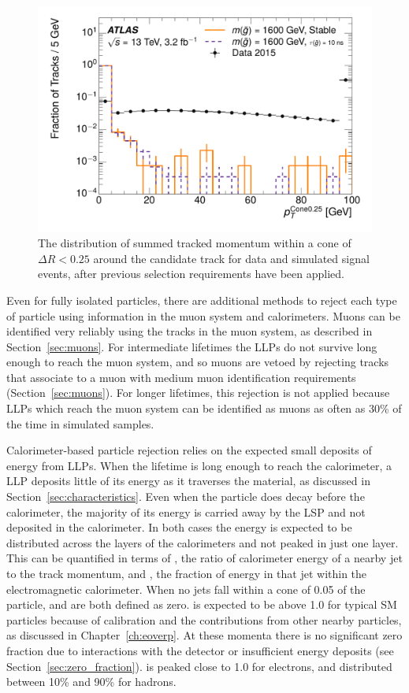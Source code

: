 \begin{figure}[h]
\centering
\includegraphics[width=\fullfig]{figures/selection_isopt_nm1.pdf}
\caption{The distribution of summed tracked momentum within a cone of $\Delta R < 0.25$ around the candidate track for data and simulated signal events, after previous selection requirements have been applied.}
\label{fig:nm1_isopt}
\end{figure}

Even for fully isolated particles, there are additional methods to reject each type of particle using information in the muon system and calorimeters.
Muons can be identified very reliably using the tracks in the muon system, as described in Section~\ref{sec:muons}.
For intermediate lifetimes the \acp{LLP} do not survive long enough to reach the muon system, and so muons are vetoed by rejecting tracks that associate to a muon with medium muon identification requirements (Section~\ref{sec:muons}).
For longer lifetimes, this rejection is not applied because \acp{LLP} which reach the muon system can be identified as muons as often as 30\% of the time in simulated samples.

Calorimeter-based particle rejection relies on the expected small deposits of energy from \acp{LLP}. 
When the lifetime is long enough to reach the calorimeter, a \ac{LLP} deposits little of its energy as it traverses the material, as discussed in Section~\ref{sec:characteristics}. 
Even when the particle does decay before the calorimeter, the majority of its energy is carried away by the \ac{LSP} and not deposited in the calorimeter.
In both cases the energy is expected to be distributed across the layers of the calorimeters and not peaked in just one layer. 
This can be quantified in terms of \ep, the ratio of calorimeter energy of a nearby jet to the track momentum, and \emfrac, the fraction of energy in that jet within the electromagnetic calorimeter.
When no jets fall within a cone of 0.05 of the particle, \ep and \emfrac are both defined as zero.
\ep is expected to be above 1.0 for typical \ac{SM} particles because of calibration and the contributions from other nearby particles, as discussed in Chapter~\ref{ch:eoverp}.
At these momenta there is no significant zero fraction due to interactions with the detector or insufficient energy deposits (see Section~\ref{sec:zero_fraction}). 
\emfrac is peaked close to 1.0 for electrons, and distributed between 10\% and 90\% for hadrons.

